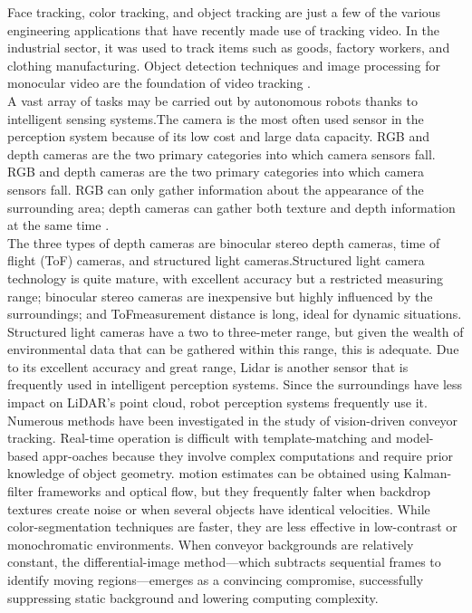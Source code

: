 \documentclass[12pt]{article}
\begin{document}
Face tracking, color tracking, and object tracking are just a few of the various engineering applications that have recently made use of tracking video.  In the industrial sector, it was used to track items such as goods, factory workers, and clothing manufacturing.  Object detection techniques and image processing for monocular video are the foundation of video tracking \cite{ref12}.\\

A vast array of tasks may be carried out by autonomous robots thanks to intelligent sensing systems.The camera is the most often used sensor in the perception system because of its low cost and large data capacity. RGB and depth cameras are the two primary categories into which camera sensors fall.  RGB and depth cameras are the two primary categories into which camera sensors fall.  RGB can only gather information about the appearance of the surrounding area; depth cameras can gather both texture and depth information at the same time \cite{ref12}.\\

The three types of depth cameras are binocular stereo depth cameras, time of flight (ToF) cameras, and structured light cameras.Structured light camera technology is quite mature, with excellent accuracy but a restricted measuring range; binocular stereo cameras are inexpensive but highly influenced by the surroundings; and ToFmeasurement distance is long, ideal for dynamic situations.  Structured light cameras have a two to three-meter range, but given the wealth of environmental data that can be gathered within this range, this is adequate. Due to its excellent accuracy and great range, Lidar is another sensor that is frequently used in intelligent perception systems.  Since the surroundings have less impact on LiDAR's point cloud, robot perception systems frequently use it\cite{ref12}.\\

Numerous methods have been investigated in the study of vision-driven conveyor tracking.  Real-time operation is difficult with template-matching and model-based appr-oaches because they involve complex computations and require prior knowledge of object geometry.  motion estimates can be obtained using Kalman-filter frameworks and optical flow, but they frequently falter when backdrop textures create noise or when several objects have identical velocities.  While color-segmentation techniques are faster, they are less effective in low-contrast or monochromatic environments.  When conveyor backgrounds are relatively constant, the differential-image method—which subtracts sequential frames to identify moving regions—emerges as a convincing compromise, successfully suppressing static background and lowering computing complexity\cite{ref12}.\\
\end{document}
